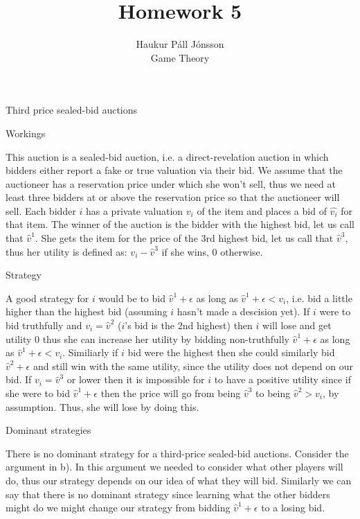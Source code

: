 \documentclass[12pt]{article}
\newenvironment{question}[2][Question]{\begin{trivlist}
\item[\hskip \labelsep {\bfseries #1}\hskip \labelsep {\bfseries #2.}]}{\end{trivlist}}
\newenvironment{answer}[2][Answer]{\begin{trivlist}
\item[\hskip \labelsep {\bfseries #1}\hskip \labelsep {\bfseries #2:}]}{\end{trivlist}}
\begin{document}
\let\oldsum\sum
\renewcommand{\sum}[3]{\oldsum\limits_{#1}^{#2}#3}
\let\oldprod\prod
\renewcommand{\prod}[3]{\oldprod\limits_{#1}^{#2}#3}

\title{Homework 5}
\author{Haukur Páll Jónsson\\
Game Theory}

\maketitle

\begin{question}{1}
Third price sealed-bid auctions
\end{question}
\begin{answer}{a)}{Workings}

This auction is a sealed-bid auction, i.e. a direct-revelation auction in which bidders either report a fake or true valuation via their bid. We assume that the auctioneer has a reservation price under which she won't sell, thus we need at least three bidders at or above the reservation price so that the auctioneer will sell. Each bidder $i$ has a private valuation $v_i$ of the item and places a bid of $\hat{v_i}$ for that item. The winner of the auction is the bidder with the highest bid, let us call that $\hat{v}^1$. She gets the item for the price of the 3rd highest bid, let us call that $\hat{v}^3$, thus her utility is defined as: $v_i-\hat{v}^3$ if she wins, $0$ otherwise.
\end{answer}
\begin{answer}{b)}{Strategy}

A good strategy for $i$ would be to bid $\hat{v}^1 + \epsilon$ as long as $\hat{v}^1 + \epsilon < v_i$, i.e. bid a little higher than the highest bid (assuming $i$ hasn't made a descision yet). If $i$ were to bid truthfully and $v_i=\hat{v}^2$ ($i$'s bid is the 2nd highest) then $i$ will lose and get utility $0$ thus she can increase her utility by bidding non-truthfully $\hat{v}^1 + \epsilon$ as long as $\hat{v}^1 + \epsilon < v_i$. Similiarly if $i$ bid were the highest then she could similarly bid $\hat{v}^2 + \epsilon$ and still win with the same utility, since the utility does not depend on our bid. If $v_i=\hat{v}^3$ or lower then it is impossible for $i$ to have a positive utility since if she were to bid $\hat{v}^1 + \epsilon$ then the price will go from being $\hat{v}^3$ to being $\hat{v}^2 > v_i$, by assumption. Thus, she will lose by doing this.
\end{answer}
\begin{answer}{c)}{Dominant strategies}

There is no dominant strategy for a third-price sealed-bid auctions. Consider the argument in b). In this argument we needed to consider what other players will do, thus our strategy depends on our idea of what they will bid. Similarly we can say that there is no dominant strategy since learning what the other bidders might do we might change our strategy from bidding $\hat{v}^1 + \epsilon$ to a losing bid.
\end{answer}
\end{document}
